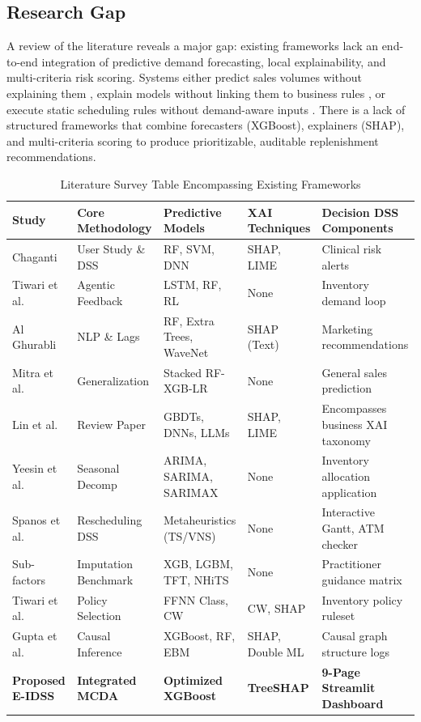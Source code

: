 \documentclass[conference]{IEEEtran}
\begin{document}
\subsection{Research Gap}
A review of the literature reveals a major gap: existing frameworks lack an end-to-end integration of predictive demand forecasting, local explainability, and multi-criteria risk scoring. Systems either predict sales volumes without explaining them \cite{mustapha2025forecasting}, explain models without linking them to business rules \cite{narlawar2025explainable}, or execute static scheduling rules without demand-aware inputs \cite{spanos2022application}. There is a lack of structured frameworks that combine forecasters (XGBoost), explainers (SHAP), and multi-criteria scoring to produce prioritizable, auditable replenishment recommendations.

\begin{table}[htbp]
\caption{Literature Survey Table Encompassing Existing Frameworks}
\label{tab:literature_survey}
\centering
\begin{tabular}{lllll}
\toprule
\textbf{Study} & \textbf{Core Methodology} & \textbf{Predictive Models} & \textbf{XAI Techniques} & \textbf{Decision DSS Components} \\
\midrule
Chaganti \cite{chaganti2026advancing} & User Study \& DSS & RF, SVM, DNN & SHAP, LIME & Clinical risk alerts \\
Tiwari et al. \cite{tiwari2025agentic} & Agentic Feedback & LSTM, RF, RL & None & Inventory demand loop \\
Al Ghurabli \cite{alghurabli2025ai} & NLP \& Lags & RF, Extra Trees, WaveNet & SHAP (Text) & Marketing recommendations \\
Mitra et al. \cite{mitra2022comparative} & Generalization & Stacked RF-XGB-LR & None & General sales prediction \\
Lin et al. \cite{lin2026critical} & Review Paper & GBDTs, DNNs, LLMs & SHAP, LIME & Encompasses business XAI taxonomy \\
Yeesin et al. \cite{yeesin2024application} & Seasonal Decomp & ARIMA, SARIMA, SARIMAX & None & Inventory allocation application \\
Spanos et al. \cite{spanos2022application} & Rescheduling DSS & Metaheuristics (TS/VNS) & None & Interactive Gantt, ATM checker \\
Sub-factors \cite{hobor2026comparative} & Imputation Benchmark & XGB, LGBM, TFT, NHiTS & None & Practitioner guidance matrix \\
Tiwari et al. \cite{tiwari2026explainable} & Policy Selection & FFNN Class, CW & CW, SHAP & Inventory policy ruleset \\
Gupta et al. \cite{gupta2025causal} & Causal Inference & XGBoost, RF, EBM & SHAP, Double ML & Causal graph structure logs \\
\textbf{Proposed E-IDSS} & \textbf{Integrated MCDA} & \textbf{Optimized XGBoost} & \textbf{TreeSHAP} & \textbf{9-Page Streamlit Dashboard} \\
\bottomrule
\end{tabular}
\end{table}
\end{document}
